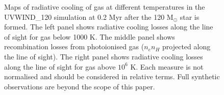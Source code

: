 \documentclass[a4paper,fleqn,usenatbib]{mnras}
\newcommand{\Msolar}{M$_{\odot}$\xspace}
\begin{document}
\begin{figure}
	\caption{Maps of radiative cooling of gas at different temperatures in the UVWIND\_120 simulation at 0.2 Myr after the 120 \Msolar star is formed. The left panel shows radiative cooling losses along the line of sight for gas below 1000 K. The middle panel shows recombination losses from photoionised gas ($n_e n_H$ projected along the line of sight). The right panel shows radiative cooling losses along the line of sight for gas above $10^6$ K. Each measure is not normalised and should be considered in relative terms. Full synthetic observations are beyond the scope of this paper.}
	\label{fig:emission_bands}
\end{figure}


\end{document}
